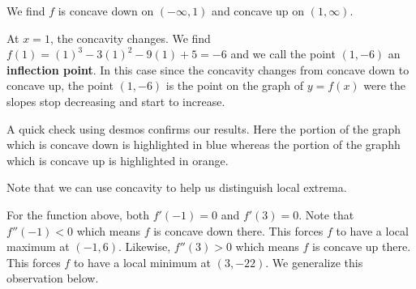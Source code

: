 \documentclass{ximera}
\begin{document}
\begin{example}
\begin{explanation}
\begin{image}
\begin{tikzpicture}[>=Latex, every node/.style={font=\normalsize}]
\end{tikzpicture}

\end{image}

We find $f$ is concave down on $(-\infty, 1)$ and concave up on $(1, \infty)$.  



At $x=1$, the concavity changes.  We find $f(1) = (1)^3 - 3(1)^2 - 9(1)+5 = -6$ and we call the point $(1, -6)$ an \textbf{inflection point}.  In this case since the concavity changes from concave down to concave up, the point $(1,-6)$ is the point on the graph of $y=f(x)$ were the slopes stop decreasing and start to increase.



A quick check using desmos confirms our results.  Here the portion of the graph which is concave down is highlighted in blue whereas the portion of the graphh which is concave up is highlighted in orange.


\begin{center}
\end{center}

\end{explanation}

\end{example}



Note that we can use concavity to help us distinguish local extrema.  



For the function above, both $f'(-1) = 0$ and $f'(3) = 0$.  Note that $f''(-1) < 0$ which means $f$ is concave down there. This forces $f$ to have a local maximum at $(-1,6)$.  Likewise, $f''(3) > 0$ which means $f$ is concave up there.  This forces $f$ to have a local minimum at $(3,-22)$.  We generalize this observation below.


\end{document}
